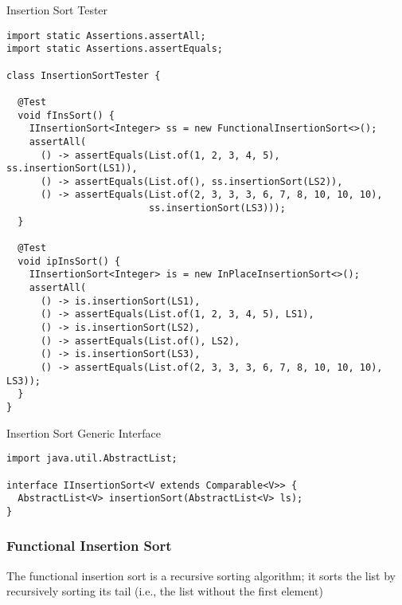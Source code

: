\begin{cl}[]{Insertion Sort Tester}
\begin{lstlisting}[language=MyJava]
import static Assertions.assertAll;
import static Assertions.assertEquals;

class InsertionSortTester {

  @Test
  void fInsSort() {
    IInsertionSort<Integer> ss = new FunctionalInsertionSort<>();
    assertAll(
      () -> assertEquals(List.of(1, 2, 3, 4, 5), ss.insertionSort(LS1)),
      () -> assertEquals(List.of(), ss.insertionSort(LS2)),
      () -> assertEquals(List.of(2, 3, 3, 3, 6, 7, 8, 10, 10, 10), 
                         ss.insertionSort(LS3)));
  }

  @Test
  void ipInsSort() {
    IInsertionSort<Integer> is = new InPlaceInsertionSort<>();
    assertAll(
      () -> is.insertionSort(LS1),
      () -> assertEquals(List.of(1, 2, 3, 4, 5), LS1),
      () -> is.insertionSort(LS2),
      () -> assertEquals(List.of(), LS2),
      () -> is.insertionSort(LS3),
      () -> assertEquals(List.of(2, 3, 3, 3, 6, 7, 8, 10, 10, 10), LS3));
  }
}
\end{lstlisting}
\end{cl}

\begin{cl}[]{Insertion Sort Generic Interface}
\begin{lstlisting}[language=MyJava]
import java.util.AbstractList;

interface IInsertionSort<V extends Comparable<V>> {
  AbstractList<V> insertionSort(AbstractList<V> ls);
}
\end{lstlisting}
\end{cl}

\subsubsection*{Functional Insertion Sort}

The functional insertion sort is a recursive sorting algorithm; it sorts the list by recursively sorting its tail (i.e., the list without the first element)

